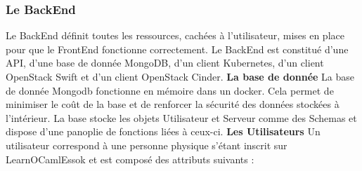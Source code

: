 \documentclass{article}
\begin{document}
\subsubsection{Le BackEnd}
Le BackEnd définit toutes les ressources, cachées à l'utilisateur, mises en place pour que le FrontEnd fonctionne correctement.
\newline
Le BackEnd est constitué d'une API, d'une base de donnée MongoDB, d'un client Kubernetes, d'un client OpenStack Swift et d'un client OpenStack Cinder.
\newline
\newline
\textbf{La base de donnée}
\newline
\newline
La base de donnée Mongodb fonctionne en mémoire dans un docker. Cela permet de minimiser le coût de la base et de renforcer la sécurité des données stockées à l'intérieur. La base stocke les objets Utilisateur et Serveur comme des Schemas et dispose d'une panoplie de fonctions liées à ceux-ci.
\newline
\newline
\textbf{Les Utilisateurs}
\newline
\newline
Un utilisateur correspond à une personne physique s'étant inscrit sur LearnOCamlEssok et est composé des attributs suivants :
\end{document}
